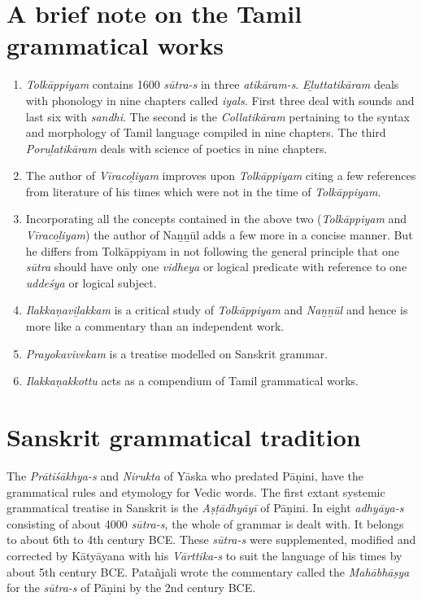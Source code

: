 \section*{A brief note on the Tamil grammatical works}

\begin{enumerate}[{\rm 1)}]
\itemsep=0pt
\item \textit{Tolkāppiyam} contains 1600 \textit{sūtra-s} in three \textit{atikāram-s}. \textit{Eḻuttatikāram} deals with phonology in nine chapters called \textit{iyals.} First three deal with sounds and last six with \textit{sandhi}. The second is the \textit{Collatikāram} pertaining to the syntax and morphology of Tamil language compiled in nine chapters. The third \textit{Poruḻatikāram} deals with science of poetics in nine chapters.

 \item The author of \textit{Vīracoḻiyam} improves upon \textit{Tolkāppiyam} citing a few references from literature of his times which were not in the time of \textit{Tolkāppiyam}.

 \item Incorporating all the concepts contained in the above two (\textit{Tolkāppiyam} and \textit{Vīracoḻiyam}) the author of Naṉṉūl adds a few more in a concise manner. But he differs from Tolkāppiyam in not following the general principle that one \textit{sūtra} should have only one \textit{vidheya} or logical predicate with reference to one \textit{uddeśya} or logical subject.

 \item \textit{Ilakkaṇaviḻakkam} is a critical study of \textit{Tolkāppiyam} and \textit{Naṉṉūl} and hence is more like a commentary than an independent work.

 \item \textit{Prayokavivekam} is a treatise modelled on Sanskrit grammar.

 \item \textit{Ilakkaṇakkottu} acts as a compendium of Tamil grammatical works.

\end{enumerate}


\section*{Sanskrit grammatical tradition}

The \textit{Prātiśākhya-s} and \textit{Nirukta} of Yāska who predated Pāṇini, have the grammatical rules and etymology for Vedic words. The first extant systemic grammatical treatise in Sanskrit is the \textit{Aṣṭādhyāyī} of Pāṇini. In eight \textit{adhyāya-s} consisting of about 4000 \textit{sūtra-s,} the whole of grammar is dealt with. It belongs to about 6th to 4th century BCE. These \textit{sūtra-s} were supplemented, modified and corrected by Kātyāyana with his \textit{Vārttika-s} to suit the language of his times by about 5th century BCE. Patañjali wrote the commentary called the \textit{Mahābhāṣya} for the \textit{sūtra-s} of Pāṇini by the 2nd century BCE.

